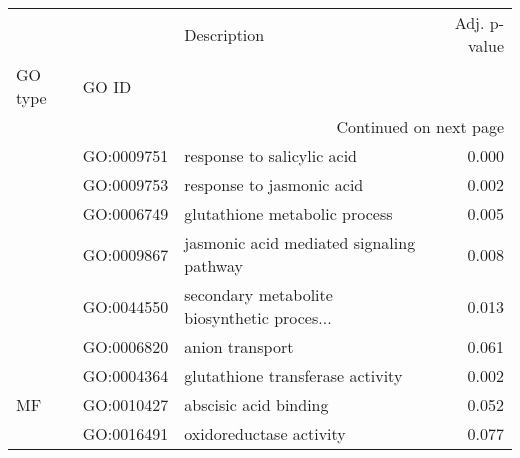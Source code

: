 \begin{longtable}{lllr}
\toprule
   &            &                                  Description &  Adj. p-value \\
GO type & GO ID &                                              &               \\
\midrule
\endhead
\midrule
\multicolumn{4}{r}{{Continued on next page}} \\
\midrule
\endfoot

\bottomrule
\endlastfoot
\multirow{6}{*}{BP} & GO:0009751 &                   response to salicylic acid &         0.000 \\
   & GO:0009753 &                    response to jasmonic acid &         0.002 \\
   & GO:0006749 &                glutathione metabolic process &         0.005 \\
   & GO:0009867 &     jasmonic acid mediated signaling pathway &         0.008 \\
   & GO:0044550 &  secondary metabolite biosynthetic proces... &         0.013 \\
   & GO:0006820 &                              anion transport &         0.061 \\
\cline{1-4}
\multirow{3}{*}{MF} & GO:0004364 &             glutathione transferase activity &         0.002 \\
   & GO:0010427 &                        abscisic acid binding &         0.052 \\
   & GO:0016491 &                      oxidoreductase activity &         0.077 \\
\end{longtable}
